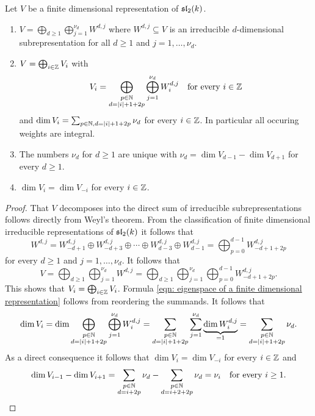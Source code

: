 \begin{thrm}\label{thrm: finite dimensional representations of sl2}
 Let $V$ be a finite dimensional representation of $\mathfrak{sl}_2(k)$.
 \begin{enumerate}[leftmargin=*]
  \item
   $V = \bigoplus_{d \geq 1} \bigoplus_{j=1}^{\nu_d} W^{d,j}$ where $W^{d,j} \subseteq V$ is an irreducible $d$-dimensional subrepresentation for all $d \geq 1$ and $j = 1, \dotsc, \nu_d$.
  \item
   $V = \bigoplus_{i \in \mathbb{Z}} V_i$ with
   \begin{equation}\label{eqn: eigenspace of a finite dimensional representation}
    V_i = \bigoplus_{\substack{p \in \mathbb{N} \\ d = |i|+1+2p}} \bigoplus_{j=1}^{\nu_d} W^{d,j}_i
    \quad \text{for every $i \in \mathbb{Z}$}
   \end{equation}
   and $\dim V_i = \sum_{p \in \mathbb{N}, d = |i|+1+2p} \nu_d$ for every $i \in \mathbb{Z}$. In particular all occuring weights are integral.
  \item 
   The numbers $\nu_d$ for $d \geq 1$ are unique with $\nu_d = \dim V_{d-1} - \dim V_{d+1}$ for every $d \geq 1$.
  \item
   $\dim V_i = \dim V_{-i}$ for every $i \in \mathbb{Z}$.
 \end{enumerate}
\end{thrm}
\begin{proof}
 That $V$ decomposes into the direct sum of irreducible subrepresentations follows directly from Weyl’s theorem. From the classification of finite dimensional irreducible representations of $\mathfrak{sl}_2(k)$ it follows that
 \[
  W^{d,j}
  = W^{d,j}_{-d+1} \oplus W^{d,j}_{-d+3} \oplus \dotsb \oplus W^{d,j}_{d-3} \oplus W^{d,j}_{d-1}
  = \bigoplus_{p=0}^{d-1} W^{d,j}_{-d+1+2p}
 \]
 for every $d \geq 1$ and $j = 1, \dotsc, \nu_d$. It follows that
 \[
  V
  = \bigoplus_{d \geq 1} \bigoplus_{j=1}^{\nu_d} W^{d,j}
  = \bigoplus_{d \geq 1} \bigoplus_{j=1}^{\nu_d} \bigoplus_{p=0}^{d-1} W^{d,j}_{-d+1+2p}.
 \]
 This shows that $V_i = \bigoplus_{i \in \mathbb{Z}} V_i$. Formula \eqref{eqn: eigenspace of a finite dimensional representation} follows from reordering the summands. It follows that
 \[
  \dim V_i
  = \dim \bigoplus_{\substack{p \in \mathbb{N} \\ d = |i|+1+2p}} \bigoplus_{j=1}^{\nu_d} W^{d,j}_i
  = \sum_{\substack{p \in \mathbb{N} \\ d = |i|+1+2p}} \sum_{j=1}^{\nu_d} \underbrace{\dim W^{d,j}_i}_{=1}
  = \sum_{\substack{p \in \mathbb{N} \\ d = |i|+1+2p}} \nu_d.
 \]
 As a direct consequence it follows that $\dim V_i = \dim V_{-i}$ for every $i \in \mathbb{Z}$ and
 \[
  \dim V_{i-1} - \dim V_{i+1}
  = \sum_{\substack{p \in \mathbb{N} \\ d = i+2p}} \nu_d - \sum_{\substack{p \in \mathbb{N} \\ d = i+2+2p}} \nu_d
  = \nu_i
  \quad\text{for every $i \geq 1$}.
 \qedhere
 \]
\end{proof}


